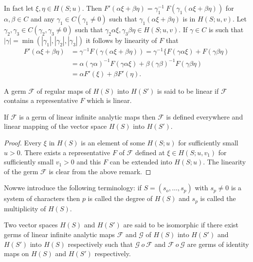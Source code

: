 In fact let $\xi,  \eta \in H(S; u)$. Then $F' (\alpha \xi + \beta
\eta) = \gamma^{-1}_1 ~ F(\gamma_1 (\alpha \xi + \beta \eta))$ for
$\alpha,  \beta \in C$ and any $\gamma_1 \in C (\gamma_1 \neq 0)$ such
that $\gamma_1 (\alpha \xi +\beta \eta)$ is in $H(S; u,  v)$. Let
$\gamma_2,  \gamma_3 \in C (\gamma_2,  \gamma_3 \neq 0)$ such that
$\gamma_2 \alpha \xi,  \gamma_3 \beta \eta \in H(S; u,  v)$. If
$\gamma \in C$ is such that $| \gamma | = \min ( | \gamma_1 |,  |
\gamma_2 |,  | \gamma_3 | )$ it follows by linearity of $F$ that  
\begin{align*}
  F' (\alpha \xi + \beta \eta) & = \gamma^{-1} F(\gamma(\alpha \xi +
  \beta \eta)) = \gamma^{-1}\{  F(\gamma \alpha \xi) + F(\gamma\beta
  \eta)\\ 
  & = \alpha (\gamma \alpha)^{-1} F(\gamma \alpha \xi) +
  \beta(\gamma\beta)^{-1}  F(\gamma \beta \eta)\\ 
  & = \alpha F' (\xi) + \beta F' (\eta).
\end{align*}

\begin{defi*}%
  A germ $\mathscr{F}$ of regular maps of $H(S)$ into $H(S')$ is said
  to be linear if $\mathscr{F}$ contains a representative $F$ which is
  linear. 
\end{defi*}

\begin{proposition}\label{chap1:sec1.3:prop8} %
  If $\mathscr{F}$ is a germ of linear infinite analytic maps then
  $\mathscr{F}$ is defined everywhere and linear mapping of the vector
  space $H(S)$ into $H(S')$. 
\end{proposition}

\begin{proof}
  Every $\xi$ in $H(S)$ is an element of some $H(S; u)$ for
  sufficiently small $u > 0$. There exists a representative $F$ of
  $\mathscr{F}$ defined at $\xi \in H(S; u,  v_1)$ for sufficiently
  small $v_1 > 0$ and this $F$ can be extended into $H(S; u)$. The
  linearity of the germ $\mathscr{F}$ is  clear from the above
  remark. 
\end{proof}

Now\pageoriginale we introduce the following terminology: if $S = (s_o,  \ldots,
s_p)$ with $s_p \neq 0$ is a system of characters then $p$ is called
the degree of $H(S)$ and $s_p$ is called the multiplicity of $H(S)$. 

\begin{defi*}%
  Two vector spaces $H(S)$ and $H(S')$ are said to be isomorphic if
  there exist germs of linear infinite analytic maps $\mathscr{F}$ and
  $\mathscr{G}$ of $H(S)$ into $H(S')$ and $H(S')$ into $H(S)$
  respectively such that $\mathscr{G} ~ o ~\mathscr{F}$ and
  $\mathscr{F} ~ o ~ \mathscr{G}$ are germs of identity maps on $H(S)$
  and $H(S')$ respectively. 
\end{defi*}

